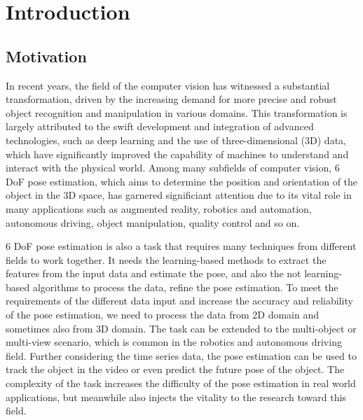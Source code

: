 \documentclass[12pt,DIV14,BCOR12mm,a4paper,footinclude=false,headinclude,parskip=half-,twoside,openright,cleardoublepage=empty,toc=index,bibliography=totoc,listof=totoc]{scrreprt}
\title{\maintitle}%
\subtitle{\translatedtitle}
\author{
\large
  \ifthenelse{\equal{\doclang}{german}}{
  \begin{tabular}{rp{7cm}}
    \Large 
    Autor:      & \Large \student \vspace*{2mm}\\
    Ausgabe:    & \startdate \\
    Abgabe:     & \submission \vspace*{3mm}\\
    Betreuer:   & \tutor \vspace*{2mm}\\
    Stichworte: & \keywords
  \end{tabular}
  }{
  \begin{tabular}{rp{7cm}}
    \Large 
    Author:             & \Large \student \vspace*{2mm}\\
    Date of work begin: & \startdate \\
    Date of submission: & \submission \vspace*{3mm}\\
    Supervisor:         & \tutor \vspace*{2mm}\\
    Keywords:           & \keywords
  \end{tabular}
  }
  \bugfix
}
\date{}
\numberwithin{equation}{chapter}
\begin{document}
\maketitle
\cleardoublepage
{} %
\tableofcontents
\cleardoublepage
\setcounter{page}{1}


\chapter{Introduction}
\section{Motivation}
In recent years, the field of the computer vision has witnessed a substantial transformation, driven by the increasing demand for more precise and robust object recognition and manipulation in various domains. This transformation is largely attributed to the swift development and integration of advanced technologies, such as deep learning and the use of three-dimensional (3D) data, which have significantly improved the capability of machines to understand and interact with the physical world. Among many subfields of computer vision, 6 DoF pose estimation, which aims to determine the position and orientation of the object in the 3D space, has garnered significiant attention due to its vital role in many applications such as augmented reality, robotics and automation, autonomous driving, object manipulation, quality control and so on.

6 DoF pose estimation is also a task that requires many techniques from different fields to work together. It needs the learning-based methods to extract the features from the input data and estimate the pose, and also the not learning-based algorithms to process the data, refine the pose estimation. To meet the requirements of the different data input and increase the accuracy and reliability of the pose estimation, we need to process the data from 2D domain and sometimes also from 3D domain. The task can be extended to the multi-object or multi-view scenario, which is common in the robotics and autonomous driving field. Further considering the time series data, the pose estimation can be used to track the object in the video or even predict the future pose of the object. The complexity of the task increases the difficulty of the pose estimation in real world applications, but meanwhile also injects the vitality to the research toward this field.
\end{document}
